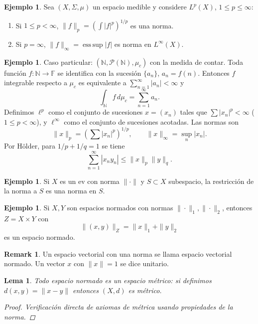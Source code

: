 \documentclass[11pt]{article}
\theoremstyle{definition}
\newtheorem{example}[definition]{Ejemplo}
\newtheorem{remark}[definition]{Remark}
\theoremstyle{plain}
\newtheorem{lemma}[definition]{Lema}
\begin{document}
\begin{example}
Sea $(X,\Sigma,\mu)$ un espacio medible y considere $L^p(X)$, $1\le p\le\infty$:
\begin{enumerate}[label=(\alph*)]
\item Si $1\le p<\infty$, $\|f\|_p=(\int|f|^p)^{1/p}$ es una norma.
\item Si $p=\infty$, $\|f\|_\infty=\operatorname{ess\,sup}|f|$ es norma en $L^\infty(X)$.
\end{enumerate}
\end{example}

\begin{example}
Caso particular: $(\mathbb{N},\mathcal{P}(\mathbb{N}),\mu_c)$ con la medida de contar. Toda función $f:\mathbb{N}\to\mathbb{F}$ se identifica con la sucesión $\{a_n\}$, $a_n=f(n)$. Entonces
$f$ integrable respecto a $\mu_c$ es equivalente a $\sum_{n=1}^\infty|a_n|<\infty$ y
$$\int_{\mathbb{N}} f\,d\mu_c=\sum_{n=1}^\infty a_n.$$
Definimos $\ell^p$ como el conjunto de sucesiones $x=(x_n)$ tales que $\sum|x_n|^p<\infty$ ($1\le p<\infty$), y $\ell^\infty$ como el conjunto de sucesiones acotadas. Las normas son
$$\|x\|_p=(\sum|x_n|^p)^{1/p},\qquad\|x\|_\infty=\sup_n|x_n|.$$
Por Hölder, para $1/p+1/q=1$ se tiene
$$\sum_{n=1}^\infty|x_ny_n|\le\|x\|_p\|y\|_q.$$
\]
\end{example}

\begin{example}
Si $X$ es un ev con norma $\|\cdot\|$ y $S\subset X$ subespacio, la restricción de la norma a $S$ es una norma en $S$.
\end{example}

\begin{example}
Si $X,Y$ son espacios normados con normas $\|\cdot\|_1,\|\cdot\|_2$, entonces $Z=X\times Y$ con
$$\|(x,y)\|_Z=\|x\|_1+\|y\|_2$$
es un espacio normado.
\end{example}

\begin{remark}
Un espacio vectorial con una norma se llama espacio vectorial normado. Un vector $x$ con $\|x\|=1$ se dice unitario.
\end{remark}

\begin{lemma}
Todo espacio normado es un espacio métrico: si definimos $d(x,y)=\|x-y\|$ entonces $(X,d)$ es métrico.
\begin{proof}
Verificación directa de axiomas de métrica usando propiedades de la norma.
\end{proof}
\end{lemma}
\end{document}
